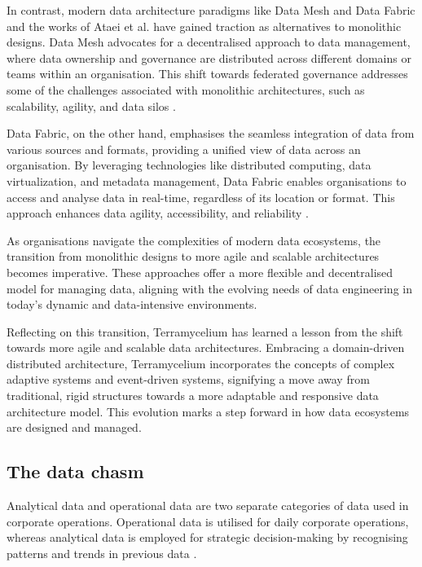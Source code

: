 \documentclass{ieeeaccess}
\begin{document}
In contrast, modern data architecture paradigms like Data Mesh \cite{DataMesh} and Data Fabric \cite{GartnerDataFabric2023} and the works of Ataei et al. \cite{ataei2023towards} have gained traction as alternatives to monolithic designs. Data Mesh advocates for a decentralised approach to data management, where data ownership and governance are distributed across different domains or teams within an organisation. This shift towards federated governance addresses some of the challenges associated with monolithic architectures, such as scalability, agility, and data silos \cite{Bode2023}.

Data Fabric, on the other hand, emphasises the seamless integration of data from various sources and formats, providing a unified view of data across an organisation. By leveraging technologies like distributed computing, data virtualization, and metadata management, Data Fabric enables organisations to access and analyse data in real-time, regardless of its location or format. This approach enhances data agility, accessibility, and reliability \cite{Bode2023}.

As organisations navigate the complexities of modern data ecosystems, the transition from monolithic designs to more agile and scalable architectures becomes imperative. These approaches offer a more flexible and decentralised model for managing data, aligning with the evolving needs of data engineering in today's dynamic and data-intensive environments.

Reflecting on this transition, Terramycelium has learned a lesson from the shift towards more agile and scalable data architectures. Embracing a domain-driven distributed architecture, Terramycelium incorporates the concepts of complex adaptive systems and event-driven systems, signifying a move away from traditional, rigid structures towards a more adaptable and responsive data architecture model. This evolution marks a step forward in how data ecosystems are designed and managed.

\subsection{The data chasm}

Analytical data and operational data are two separate categories of data used in corporate operations. Operational data is utilised for daily corporate operations, whereas analytical data is employed for strategic decision-making by recognising patterns and trends in previous data \cite{kimball2013data}.
\end{document}
